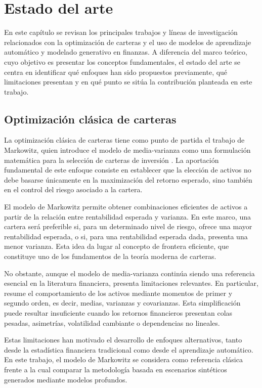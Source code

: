 \section{Estado del arte}

En este capítulo se revisan los principales trabajos y líneas de investigación relacionados con la optimización de carteras y el uso de modelos de aprendizaje automático y modelado generativo en finanzas. A diferencia del marco teórico, cuyo objetivo es presentar los conceptos fundamentales, el estado del arte se centra en identificar qué enfoques han sido propuestos previamente, qué limitaciones presentan y en qué punto se sitúa la contribución planteada en este trabajo.

\subsection{Optimización clásica de carteras}

La optimización clásica de carteras tiene como punto de partida el trabajo de Markowitz, quien introduce el modelo de media-varianza como una formulación matemática para la selección de carteras de inversión \citeyear{markowitz1952}. La aportación fundamental de este enfoque consiste en establecer que la elección de activos no debe basarse únicamente en la maximización del retorno esperado, sino también en el control del riesgo asociado a la cartera.

El modelo de Markowitz permite obtener combinaciones eficientes de activos a partir de la relación entre rentabilidad esperada y varianza. En este marco, una cartera será preferible si, para un determinado nivel de riesgo, ofrece una mayor rentabilidad esperada, o si, para una rentabilidad esperada dada, presenta una menor varianza. Esta idea da lugar al concepto de frontera eficiente, que constituye uno de los fundamentos de la teoría moderna de carteras.

No obstante, aunque el modelo de media-varianza continúa siendo una referencia esencial en la literatura financiera, presenta limitaciones relevantes. En particular, resume el comportamiento de los activos mediante momentos de primer y segundo orden, es decir, medias, varianzas y covarianzas. Esta simplificación puede resultar insuficiente cuando los retornos financieros presentan colas pesadas, asimetrías, volatilidad cambiante o dependencias no lineales.

Estas limitaciones han motivado el desarrollo de enfoques alternativos, tanto desde la estadística financiera tradicional como desde el aprendizaje automático. En este trabajo, el modelo de Markowitz se considera como referencia clásica frente a la cual comparar la metodología basada en escenarios sintéticos generados mediante modelos profundos.

